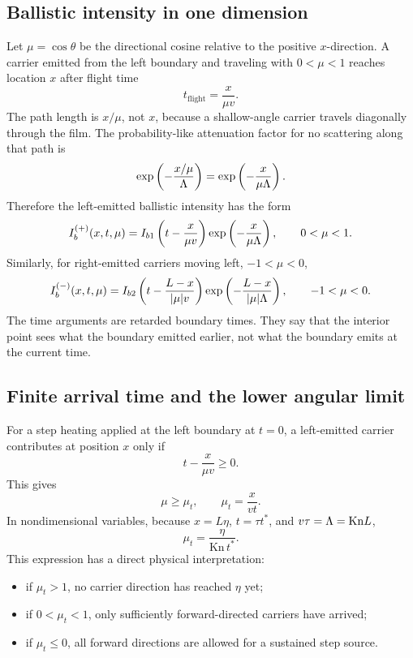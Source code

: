 \documentclass[11pt]{article}
\begin{document}
\subsection{Ballistic intensity in one dimension}
Let \(\mu=\cos\theta\) be the directional cosine relative to the positive \(x\)-direction. A carrier emitted from the left boundary and traveling with \(0<\mu<1\) reaches location \(x\) after flight time
\begin{equation}
    t_{\mathrm{flight}}=\frac{x}{\mu v}.
\end{equation}
The path length is \(x/\mu\), not \(x\), because a shallow-angle carrier travels diagonally through the film. The probability-like attenuation factor for no scattering along that path is
\begin{equation}
    \exp\left(-\frac{x/\mu}{\Lambda}\right)
    =\exp\left(-\frac{x}{\mu\Lambda}\right).
\end{equation}
Therefore the left-emitted ballistic intensity has the form
\begin{equation}
    I_b^{(+)}(x,t,\mu)
    =I_{b1}\left(t-\frac{x}{\mu v}\right)
    \exp\left(-\frac{x}{\mu\Lambda}\right),
    \qquad 0<\mu<1.
    \label{eq:left_ib_1d_expanded}
\end{equation}
Similarly, for right-emitted carriers moving left, \(-1<\mu<0\),
\begin{equation}
    I_b^{(-)}(x,t,\mu)
    =I_{b2}\left(t-\frac{L-x}{|\mu|v}\right)
    \exp\left(-\frac{L-x}{|\mu|\Lambda}\right),
    \qquad -1<\mu<0.
    \label{eq:right_ib_1d_expanded}
\end{equation}
The time arguments are retarded boundary times. They say that the interior point sees what the boundary emitted earlier, not what the boundary emits at the current time.

\subsection{Finite arrival time and the lower angular limit}
For a step heating applied at the left boundary at \(t=0\), a left-emitted carrier contributes at position \(x\) only if
\begin{equation}
    t-\frac{x}{\mu v}\geq 0.
\end{equation}
This gives
\begin{equation}
    \mu\geq \mu_t,\qquad \mu_t=\frac{x}{vt}.
\end{equation}
In nondimensional variables, because \(x=L\eta\), \(t=\tau t^*\), and \(v\tau=\Lambda=\mathrm{Kn}L\),
\begin{equation}
    \boxed{\mu_t=\frac{\eta}{\mathrm{Kn}\,t^*}.}
    \label{eq:mu_t_expanded}
\end{equation}
This expression has a direct physical interpretation:
\begin{itemize}[leftmargin=1.6em]
    \item if \(\mu_t>1\), no carrier direction has reached \(\eta\) yet;
    \item if \(0<\mu_t<1\), only sufficiently forward-directed carriers have arrived;
    \item if \(\mu_t\leq 0\), all forward directions are allowed for a sustained step source.
\end{itemize}
\end{document}
